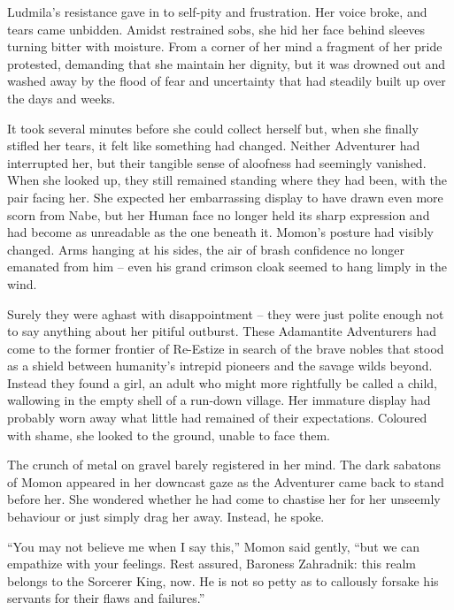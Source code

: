  

Ludmila’s resistance gave in to self-pity and frustration. Her voice broke, and tears came unbidden. Amidst restrained sobs, she hid her face behind sleeves turning bitter with moisture. From a corner of her mind a fragment of her pride protested, demanding that she maintain her dignity, but it was drowned out and washed away by the flood of fear and uncertainty that had steadily built up over the days and weeks.

 

It took several minutes before she could collect herself but, when she finally stifled her tears, it felt like something had changed. Neither Adventurer had interrupted her, but their tangible sense of aloofness had seemingly vanished. When she looked up, they still remained standing where they had been, with the pair facing her. She expected her embarrassing display to have drawn even more scorn from Nabe, but her Human face no longer held its sharp expression and had become as unreadable as the one beneath it. Momon’s posture had visibly changed. Arms hanging at his sides, the air of brash confidence no longer emanated from him – even his grand crimson cloak seemed to hang limply in the wind.

 

Surely they were aghast with disappointment – they were just polite enough not to say anything about her pitiful outburst. These Adamantite Adventurers had come to the former frontier of Re-Estize in search of the brave nobles that stood as a shield between humanity’s intrepid pioneers and the savage wilds beyond. Instead they found a girl, an adult who might more rightfully be called a child, wallowing in the empty shell of a run-down village. Her immature display had probably worn away what little had remained of their expectations. Coloured with shame, she looked to the ground, unable to face them.

 

The crunch of metal on gravel barely registered in her mind. The dark sabatons of Momon appeared in her downcast gaze as the Adventurer came back to stand before her. She wondered whether he had come to chastise her for her unseemly behaviour or just simply drag her away. Instead, he spoke.

 

“You may not believe me when I say this,” Momon said gently, “but we can empathize with your feelings. Rest assured, Baroness Zahradnik: this realm belongs to the Sorcerer King, now. He is not so petty as to callously forsake his servants for their flaws and failures.”

